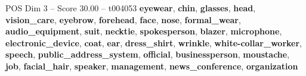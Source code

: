 \begin{textsample}{POS Dim 3 – Score 30.00 – t004053}  \label{ex:f3_pos_033}
\textbf{eyewear}, \textbf{chin}, \textbf{glasses}, \textbf{head}, \textbf{vision\_care}, \textbf{eyebrow}, \textbf{forehead}, \textbf{face}, \textbf{nose}, \textbf{formal\_wear}, \textbf{audio\_equipment}, \textbf{suit}, \textbf{necktie}, \textbf{spokesperson}, \textbf{blazer}, \textbf{microphone}, \textbf{electronic\_device}, \textbf{coat}, \textbf{ear}, \textbf{dress\_shirt}, \textbf{wrinkle}, \textbf{white-collar\_worker}, \textbf{speech}, \textbf{public\_address\_system}, \textbf{official}, \textbf{businessperson}, \textbf{moustache}, \textbf{job}, \textbf{facial\_hair}, \textbf{speaker}, \textbf{management}, \textbf{news\_conference}, \textbf{organization}

\end{textsample}
